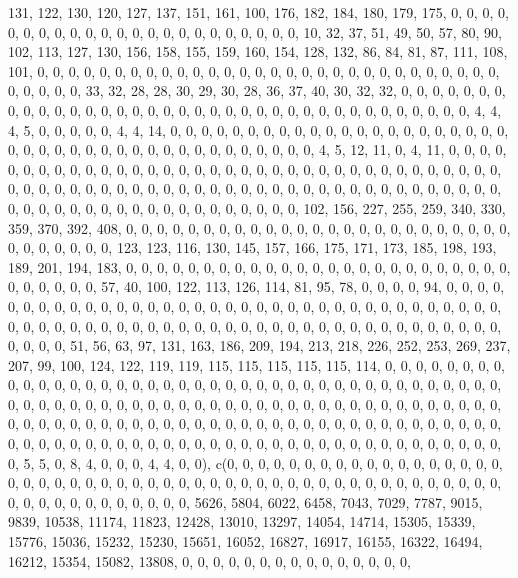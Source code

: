 \documentclass[
]{article}
\begin{document}
131, 122, 130, 120, 127, 137, 151, 161, 100, 176, 182, 184, 180, 179,
175, 0, 0, 0, 0, 0, 0, 0, 0, 0, 0, 0, 0, 0, 0, 0, 0, 0, 0, 0, 0, 0, 0,
0, 10, 32, 37, 51, 49, 50, 57, 80, 90, 102, 113, 127, 130, 156, 158,
155, 159, 160, 154, 128, 132, 86, 84, 81, 87, 111, 108, 101, 0, 0, 0, 0,
0, 0, 0, 0, 0, 0, 0, 0, 0, 0, 0, 0, 0, 0, 0, 0, 0, 0, 0, 0, 0, 0, 0, 0,
0, 0, 0, 0, 0, 0, 0, 33, 32, 28, 28, 30, 29, 30, 28, 36, 37, 40, 30, 32,
32, 0, 0, 0, 0, 0, 0, 0, 0, 0, 0, 0, 0, 0, 0, 0, 0, 0, 0, 0, 0, 0, 0, 0,
0, 0, 0, 0, 0, 0, 0, 0, 0, 0, 0, 0, 0, 0, 4, 4, 4, 5, 0, 0, 0, 0, 0, 4,
4, 14, 0, 0, 0, 0, 0, 0, 0, 0, 0, 0, 0, 0, 0, 0, 0, 0, 0, 0, 0, 0, 0, 0,
0, 0, 0, 0, 0, 0, 0, 0, 0, 0, 0, 0, 0, 0, 0, 0, 0, 0, 0, 0, 4, 5, 12,
11, 0, 4, 11, 0, 0, 0, 0, 0, 0, 0, 0, 0, 0, 0, 0, 0, 0, 0, 0, 0, 0, 0,
0, 0, 0, 0, 0, 0, 0, 0, 0, 0, 0, 0, 0, 0, 0, 0, 0, 0, 0, 0, 0, 0, 0, 0,
0, 0, 0, 0, 0, 0, 0, 0, 0, 0, 0, 0, 0, 0, 0, 0, 0, 0, 0, 0, 0, 0, 0, 0,
0, 0, 0, 0, 0, 0, 0, 0, 0, 0, 0, 0, 0, 0, 0, 0, 0, 0, 0, 0, 102, 156,
227, 255, 259, 340, 330, 359, 370, 392, 408, 0, 0, 0, 0, 0, 0, 0, 0, 0,
0, 0, 0, 0, 0, 0, 0, 0, 0, 0, 0, 0, 0, 0, 0, 0, 0, 0, 0, 0, 0, 0, 0,
123, 123, 116, 130, 145, 157, 166, 175, 171, 173, 185, 198, 193, 189,
201, 194, 183, 0, 0, 0, 0, 0, 0, 0, 0, 0, 0, 0, 0, 0, 0, 0, 0, 0, 0, 0,
0, 0, 0, 0, 0, 0, 0, 0, 0, 0, 0, 0, 57, 40, 100, 122, 113, 126, 114, 81,
95, 78, 0, 0, 0, 0, 94, 0, 0, 0, 0, 0, 0, 0, 0, 0, 0, 0, 0, 0, 0, 0, 0,
0, 0, 0, 0, 0, 0, 0, 0, 0, 0, 0, 0, 0, 0, 0, 0, 0, 0, 0, 0, 0, 0, 0, 0,
0, 0, 0, 0, 0, 0, 0, 0, 0, 0, 0, 0, 0, 0, 0, 0, 0, 0, 0, 0, 0, 0, 0, 0,
0, 0, 0, 0, 0, 0, 0, 0, 51, 56, 63, 97, 131, 163, 186, 209, 194, 213,
218, 226, 252, 253, 269, 237, 207, 99, 100, 124, 122, 119, 119, 115,
115, 115, 115, 115, 114, 0, 0, 0, 0, 0, 0, 0, 0, 0, 0, 0, 0, 0, 0, 0, 0,
0, 0, 0, 0, 0, 0, 0, 0, 0, 0, 0, 0, 0, 0, 0, 0, 0, 0, 0, 0, 0, 0, 0, 0,
0, 0, 0, 0, 0, 0, 0, 0, 0, 0, 0, 0, 0, 0, 0, 0, 0, 0, 0, 0, 0, 0, 0, 0,
0, 0, 0, 0, 0, 0, 0, 0, 0, 0, 0, 0, 0, 0, 0, 0, 0, 0, 0, 0, 0, 0, 0, 0,
0, 0, 0, 0, 0, 0, 0, 0, 0, 0, 0, 0, 0, 0, 0, 0, 0, 0, 0, 0, 0, 0, 0, 0,
0, 0, 0, 0, 0, 0, 0, 0, 0, 0, 0, 0, 0, 0, 0, 0, 0, 0, 0, 0, 0, 0, 0, 0,
0, 5, 5, 0, 8, 4, 0, 0, 0, 4, 4, 0, 0), c(0, 0, 0, 0, 0, 0, 0, 0, 0, 0,
0, 0, 0, 0, 0, 0, 0, 0, 0, 0, 0, 0, 0, 0, 0, 0, 0, 0, 0, 0, 0, 0, 0, 0,
0, 0, 0, 0, 0, 0, 0, 0, 0, 0, 0, 0, 0, 0, 0, 0, 0, 0, 0, 0, 0, 0, 0, 0,
0, 0, 0, 0, 5626, 5804, 6022, 6458, 7043, 7029, 7787, 9015, 9839, 10538,
11174, 11823, 12428, 13010, 13297, 14054, 14714, 15305, 15339, 15776,
15036, 15232, 15230, 15651, 16052, 16827, 16917, 16155, 16322, 16494,
16212, 15354, 15082, 13808, 0, 0, 0, 0, 0, 0, 0, 0, 0, 0, 0, 0, 0, 0, 0,
\end{document}
